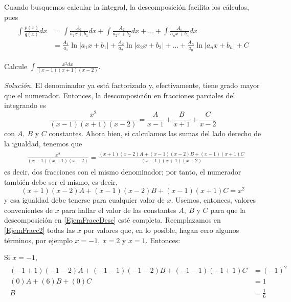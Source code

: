 Cuando busquemos calcular la integral, la descomposición facilita los cálculos, pues
\begin{gather*}
  \begin{aligned}
    \int \frac{p(x)}{q(x)}dx&=\int\frac{A_1}{a_1x+b_1}dx+\int\frac{A_2}{a_2x+b_2}dx
    +\ldots+\int\frac{A_n}{a_nx+b_n}dx\\
    &=\frac{A_1}{a_1}\ln\vert a_1x+b_1\vert+\frac{A_2}{a_2}\ln\vert a_2x+b_2\vert+\ldots+\frac{A_n}{a_n}\ln\vert a_nx+b_n\vert+C
  \end{aligned}
\end{gather*}

\begin{ejemplo}
  Calcule $\int \frac{x^{2}dx}{(x-1)(x+1)(x-2)}$.
\end{ejemplo}
\emph{Solución.} El denominador ya está factorizado y, efectivamente, tiene grado mayor que el numerador. Entonces, la descomposición en fracciones parciales del integrando es
\begin{equation}\label{EjemFraccDesc}
  \frac{x^{2}}{(x-1)(x+1)(x-2)}=\frac{A}{x-1}+\frac{B}{x+1}+\frac{C}{x-2}
\end{equation}
con $A,\ B$ y $C$ constantes. Ahora bien, si calculamos las sumas del lado derecho de la igualdad, tenemos que
\begin{gather}\label{EjemFracc}
  \begin{aligned}
    &\frac{x^{2}}{(x-1)(x+1)(x-2)}=\frac{(x+1)(x-2)A+(x-1)(x-2)B+
    (x-1)(x+1)C}{(x-1)(x+1)(x-2)}
  \end{aligned}
\end{gather}
es decir, dos fracciones con el mismo denominador; por tanto, el numerador también debe ser el mismo, es decir,
\begin{equation}\label{EjemFracc2}
  (x+1)(x-2)A+(x-1)(x-2)B+(x-1)(x+1)C=x^{2}
\end{equation}
y esa igualdad debe tenerse para cualquier valor de $x$. Usemos, entonces, valores convenientes de $x$ para hallar el valor de las constantes $A,\ B$ y $C$ para que la descomposición en \eqref{EjemFraccDesc} esté completa. Reemplazamos en \eqref{EjemFracc2} todas las $x$ por valores que, en lo posible, hagan cero algunos términos, por ejemplo $x=-1,\ x=2$ y $x=1$. Entonces:

Si $x=-1$,
\begin{gather*}
  \begin{aligned}
    (-1+1)(-1-2)A+(-1-1)(-1-2)B+(-1-1)(-1+1)C&=(-1)^{2} \\
    (0)A+(6)B+(0)C&=1 \\
    B&=\frac{1}{6}
  \end{aligned}
\end{gather*}

